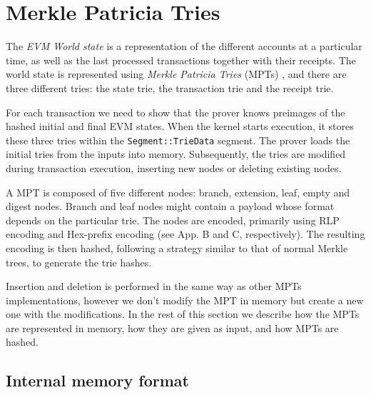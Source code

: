 \section{Merkle Patricia Tries}
\label{tries}
The \emph{EVM World state} is a representation of the different accounts at a particular time, as well as the last processed transactions together with their receipts. The world state is represented using \emph{Merkle Patricia Tries} (MPTs) \cite[App.~D]{yellowpaper}, and there are three different tries: the state trie, the transaction trie and the receipt trie.

For each transaction we need to show that the prover knows preimages of the hashed initial and final EVM states.  When the kernel starts execution, it stores these three tries within the {\tt Segment::TrieData} segment. The prover loads the initial tries from the inputs into memory. Subsequently, the tries are modified during transaction execution, inserting new nodes or deleting existing nodes. 

A MPT is composed of five different nodes: branch, extension, leaf, empty and digest nodes. Branch and leaf nodes might contain a payload whose format depends on the particular trie. The nodes are encoded, primarily using RLP encoding and Hex-prefix encoding (see \cite{yellowpaper} App. B and C, respectively). The resulting encoding is then hashed, following a strategy similar to that of normal Merkle trees, to generate the trie hashes.

Insertion and deletion is performed in the same way as other MPTs implementations, however we don't modify the MPT in memory but create a new one with the modifications. In the rest of this section we describe how the MPTs are represented in memory, how they are given as input, and how MPTs are hashed.

\subsection{Internal memory format}

